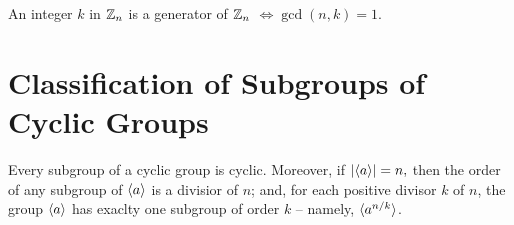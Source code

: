 \begin{corollary}
  An integer $k$ in $\mathbb{Z}_n$ is a generator of $\mathbb{Z}_n$ $\iff \gcd(n,k) = 1$.
\end{corollary}

\section{Classification of Subgroups of Cyclic Groups}

\begin{thm}
  Every subgroup of a cyclic group is cyclic. Moreover, if $\abs{\langle a \rangle } = n,$ then the order of any subgroup of $\langle a \rangle$ is a divisior of $n$; and, for each positive divisor $k$ of $n$, the group $\langle a \rangle$ has exaclty one subgroup of order $k$ -- namely, $\langle a^{n/k} \rangle$.
\end{thm}
